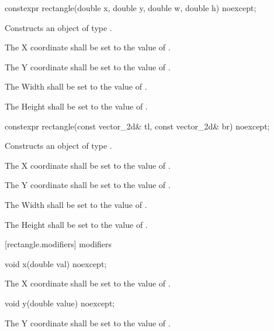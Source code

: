 \begin{itemdecl}
constexpr rectangle(double x, double y, double w, double h) noexcept;
\end{itemdecl}
\begin{itemdescr}
\pnum
\effects
Constructs an object of type .

\pnum
The X coordinate shall be set to the value of .

\pnum
The Y coordinate shall be set to the value of .

\pnum
The Width shall be set to the value of .

\pnum
The Height shall be set to the value of .
\end{itemdescr}

\begin{itemdecl}
constexpr rectangle(const vector_2d& tl, const vector_2d& br) noexcept;
\end{itemdecl}
\begin{itemdescr}
\pnum
\effects
Constructs an object of type .

\pnum
The X coordinate shall be set to the value of .

\pnum
The Y coordinate shall be set to the value of .

\pnum
The Width shall be set to the value of .

\pnum
The Height shall be set to the value of .
\end{itemdescr}

 [rectangle.modifiers]{ modifiers}

\begin{itemdecl}
void x(double val) noexcept;
\end{itemdecl}

\begin{itemdescr}
\pnum
\effects
The X coordinate shall be set to the value of .
\end{itemdescr}

\begin{itemdecl}
void y(double value) noexcept;
\end{itemdecl}
\begin{itemdescr}
\pnum
\effects
The Y coordinate shall be set to the value of .
\end{itemdescr}

